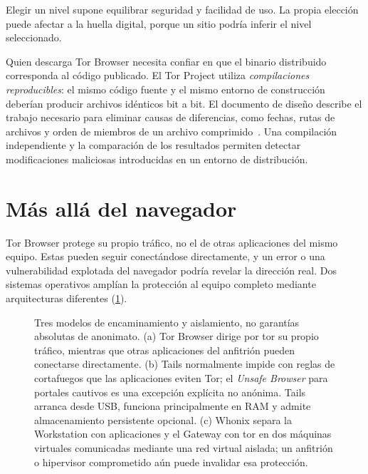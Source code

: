 Elegir un nivel supone equilibrar seguridad y facilidad de uso. La propia elección puede afectar a la huella digital, porque un sitio podría inferir el nivel seleccionado.

\begin{approfondimento}
Quien descarga Tor Browser necesita confiar en que el binario distribuido corresponda al código publicado. El Tor Project utiliza \emph{compilaciones reproducibles}: el mismo código fuente y el mismo entorno de construcción deberían producir archivos idénticos bit a bit. El documento de diseño describe el trabajo necesario para eliminar causas de diferencias, como fechas, rutas de archivos y orden de miembros de un archivo comprimido~\cite{perry2018torbrowser}. Una compilación independiente y la comparación de los resultados permiten detectar modificaciones maliciosas introducidas en un entorno de distribución.
\end{approfondimento}

\section{Más allá del navegador}\label{sec:browser-sistemi}

Tor Browser protege su propio tráfico, no el de otras aplicaciones del mismo equipo. Estas pueden seguir conectándose directamente, y un error o una vulnerabilidad explotada del navegador podría revelar la dirección real. Dos sistemas operativos amplían la protección al equipo completo mediante arquitecturas diferentes (\cref{fig:architetture}).

\begin{figure}[htbp]
\centering

\caption{Tres modelos de encaminamiento y aislamiento, no garantías absolutas de anonimato. (a) Tor Browser dirige por tor su propio tráfico, mientras que otras aplicaciones del anfitrión pueden conectarse directamente. (b) Tails normalmente impide con reglas de cortafuegos que las aplicaciones eviten Tor; el \emph{Unsafe Browser} para portales cautivos es una excepción explícita no anónima. Tails arranca desde USB, funciona principalmente en RAM y admite almacenamiento persistente opcional. (c) Whonix separa la Workstation con aplicaciones y el Gateway con tor en dos máquinas virtuales comunicadas mediante una red virtual aislada; un anfitrión o hipervisor comprometido aún puede invalidar esa protección.}
\label{fig:architetture}
\end{figure}


